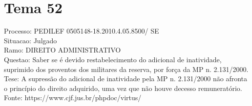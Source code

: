 \documentclass[12pt]{article}
\begin{document}
\section*{Tema 52}
Processo: PEDILEF 0505148-18.2010.4.05.8500/ SE\\
Situacao: Julgado\\
Ramo: DIREITO ADMINISTRATIVO\\
Questao: Saber se é devido restabelecimento do adicional de inatividade, suprimido dos proventos dos militares da reserva, por força da MP n. 2.131/2000.\\
Tese: A supressão do adicional de inatividade pela MP n. 2.131/2000 não afronta o princípio do direito adquirido, uma vez que não houve decesso remuneratório.\\
Fonte: https://www.cjf.jus.br/phpdoc/virtus/
\end{document}
